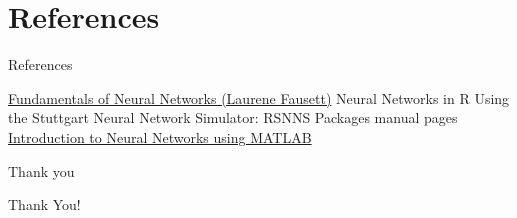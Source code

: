 \documentclass[xcolor=table]{beamer}
\begin{document}
\section{References}
\begin{frame}{References}
\begin{thebibliography}{widest entry}
 \url{Fundamentals of Neural Networks (Laurene Fausett)}
 {Neural Networks in R Using the Stuttgart Neural Network Simulator: RSNNS}
 {Packages manual pages}
 \url{Introduction to Neural Networks using MATLAB}
\end{thebibliography}

\end{frame}

\begin{frame}{Thank you}
\begin{center}
\vskip1cm
Thank You!
\end{center}
\end{frame}
\end{document}
